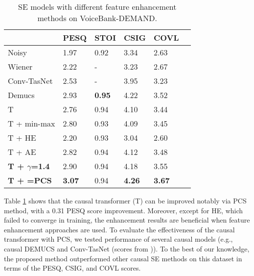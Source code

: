 \documentclass[a4paper]{article}
\begin{document}
\begin{table}
\caption{SE models with different feature enhancement methods on VoiceBank-DEMAND.}
\vspace{-0.2cm}
\label{table_1}
\centering
\begin{tabular*}{\linewidth}{l||lllll} 
\hline
                  & PESQ  & STOI  & CSIG  & COVL  \\ 
\hline
Noisy             & 1.97 & 0.92 & 3.34 & 2.63 \\
\hline
Wiener \cite{pascual2017segan} & 2.22 & - & 3.23 & 2.67 \\
Conv-TasNet \cite{koyama2020exploring} & 2.53 & - & 3.95 & 3.23 \\ 
Demucs \cite{defossez2020real} & 2.93  & \textbf{0.95}   & 4.22  & 3.52 \\
T \cite{fu2020boosting} & 2.76 & 0.94 & 4.10 & 3.44 \\
T + min-max       & 2.80 & 0.93 & 4.09 & 3.45 \\
T + HE  & 2.20 & 0.93 & 3.04 & 2.60 & \\
T + AE            & 2.82 & 0.94 & 4.12 & 3.48 \\
\hline
\hline
\textbf{T + $\gamma$=1.4}   & 2.90 & 0.94 & 4.18 & 3.55 \\
\textbf{T + \boldsymbol{$\gamma$}=PCS} & \textbf{3.07} & 0.94 & \textbf{4.26} & \textbf{3.67} \\
\hline
\end{tabular*}
\end{table}
Table \ref{table_1} shows that the causal transformer (T) can be improved notably via PCS method, with a 0.31 PESQ score improvement. Moreover, except for HE, which failed to converge in training, the enhancement results are beneficial when feature enhancement approaches are used. To evaluate the effectiveness of the causal transformer with PCS, we tested performance of several causal models (e.g., causal DEMUCS \cite{defossez2020real} and Conv-TasNet (scores from \cite{koyama2020exploring})).
To the best of our knowledge, the proposed method outperformed other causal SE methods on this dataset in terms of the PESQ, CSIG, and COVL scores.
\end{document}
